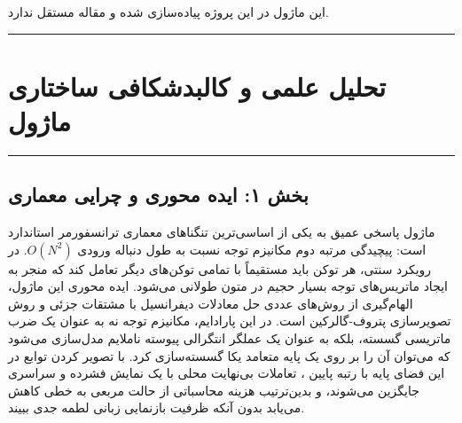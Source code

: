 \clearpage
{}
\vspace*{0.2cm}

این ماژول در این پروژه پیاده‌سازی شده و مقاله مستقل ندارد.
\noindent\rule{\textwidth}{1.2pt}
\vspace*{0.1cm}
\section{تحلیل علمی و کالبدشکافی ساختاری ماژول }
\label{sec:mod_galerkin_attention}
\vspace*{-0.2cm}
\noindent\rule{\textwidth}{0.5pt}
\vspace*{0.3cm}

\subsection*{بخش ۱: ایده محوری و چرایی معماری }
ماژول  پاسخی عمیق به یکی از اساسی‌ترین تنگناهای معماری ترانسفورمر استاندارد است: پیچیدگی مرتبه دوم مکانیزم توجه نسبت به طول دنباله ورودی $O(N^2)$. در رویکرد سنتی، هر توکن باید مستقیماً با تمامی توکن‌های دیگر تعامل کند که منجر به ایجاد ماتریس‌های توجه بسیار حجیم در متون طولانی می‌شود. ایده محوری این ماژول، الهام‌گیری از روش‌های عددی حل معادلات دیفرانسیل با مشتقات جزئی  و روش تصویرسازی پتروف-گالرکین  است. در این پارادایم، مکانیزم توجه نه به عنوان یک ضرب ماتریسی گسسته، بلکه به عنوان یک عملگر انتگرالی پیوسته ناملایم مدل‌سازی می‌شود که می‌توان آن را بر روی یک پایه متعامد یکا  گسسته‌سازی کرد. با تصویر کردن توابع در این فضای پایه با رتبه پایین ، تعاملات بی‌نهایت محلی با یک نمایش فشرده و سراسری جایگزین می‌شوند، و بدین‌ترتیب هزینه محاسباتی از حالت مربعی به خطی کاهش می‌یابد بدون آنکه ظرفیت بازنمایی زبانی لطمه جدی ببیند.

